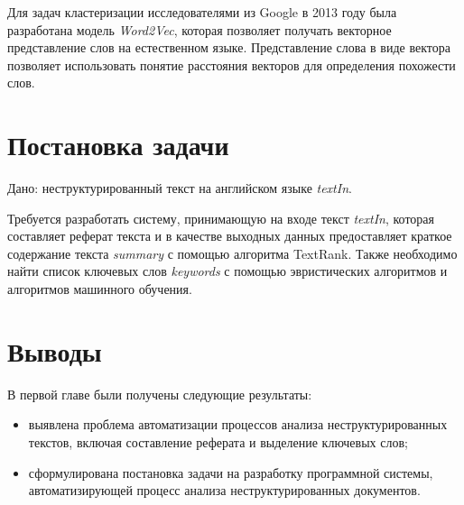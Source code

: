 Для задач кластеризации исследователями из Google в 2013 году была разработана модель \textit{Word2Vec}, которая позволяет получать векторное представление слов на естественном языке. Представление слова в виде вектора позволяет использовать понятие расстояния векторов для определения похожести слов.

\section{Постановка задачи}

Дано: неструктурированный текст на английском языке \textit{textIn}.

Требуется разработать систему, принимающую на входе текст \textit{textIn}, которая составляет реферат текста и в качестве выходных данных предоставляет краткое содержание текста \textit{summary} с помощью алгоритма TextRank. Также необходимо найти список ключевых слов \textit{keywords} с помощью эвристических алгоритмов и алгоритмов машинного обучения.

\section{Выводы}

В первой главе были получены следующие результаты:
\begin{itemize}
    \item выявлена проблема автоматизации процессов анализа неструктурированных текстов, включая составление реферата и выделение ключевых слов;
    \item сформулирована постановка задачи на разработку программной системы, автоматизирующей процесс анализа неструктурированных документов.
\end{itemize}
\newpage
